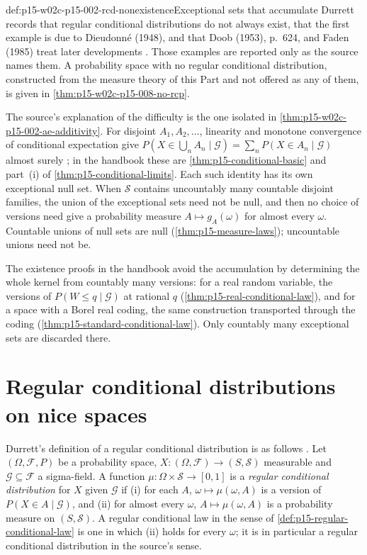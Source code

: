 \begin{hbwarning}{def:p15-w02c-p15-002-rcd-nonexistence}{Exceptional sets that accumulate}
Durrett records that regular conditional distributions do not always exist,
that the first example is due to Dieudonn\'e (1948), and that Doob (1953),
p.~624, and Faden (1985) treat later developments
\cite[p.~214]{DurrettPTEAuthor2019}. Those examples are reported only as
the source names them. A probability space with no regular conditional
distribution, constructed from the measure theory of this Part and not
offered as any of them, is given in \cref{thm:p15-w02c-p15-008-no-rcp}.

The source's explanation of the difficulty is the one isolated in
\cref{thm:p15-w02c-p15-002-ae-additivity}. For disjoint
\(A_1,A_2,\ldots\), linearity and monotone convergence of conditional
expectation give
\(P(X\in\bigcup_nA_n\mid\mathcal G)=\sum_nP(X\in A_n\mid\mathcal G)\)
almost surely \cite[p.~214]{DurrettPTEAuthor2019}; in the handbook these
are \cref{thm:p15-conditional-basic} and part~(i) of
\cref{thm:p15-conditional-limits}. Each such identity has its own
exceptional null set. When \(\mathcal S\) contains uncountably many
countable disjoint families, the union of the exceptional sets need not
be null, and then no choice of versions need give a probability measure
\(A\mapsto g_A(\omega)\) for almost every \(\omega\). Countable unions of
null sets are null (\cref{thm:p15-measure-laws}); uncountable unions need
not be.

The existence proofs in the handbook avoid the accumulation by
determining the whole kernel from countably many versions: for a real
random variable, the versions of \(P(W\leq q\mid\mathcal G)\) at rational
\(q\) (\cref{thm:p15-real-conditional-law}), and for a space with a Borel
real coding, the same construction transported through the coding
(\cref{thm:p15-standard-conditional-law}). Only countably many exceptional
sets are discarded there.
\end{hbwarning}

\section{Regular conditional distributions on nice spaces}
\label{sec:p15-w02c-p15-002-nice-rcd}

Durrett's definition of a regular conditional distribution is as follows
\cite[p.~214]{DurrettPTEAuthor2019}. Let \((\Omega,\mathcal F,P)\) be a
probability space, \(X:(\Omega,\mathcal F)\to(S,\mathcal S)\) measurable
and \(\mathcal G\subseteq\mathcal F\) a sigma-field. A function
\(\mu:\Omega\times\mathcal S\to[0,1]\) is a \emph{regular conditional
distribution} for \(X\) given \(\mathcal G\) if (i) for each \(A\),
\(\omega\mapsto\mu(\omega,A)\) is a version of \(P(X\in A\mid\mathcal G)\),
and (ii) for almost every \(\omega\), \(A\mapsto\mu(\omega,A)\) is a
probability measure on \((S,\mathcal S)\). A regular conditional law in
the sense of \cref{def:p15-regular-conditional-law} is one in which (ii)
holds for every \(\omega\); it is in particular a regular conditional
distribution in the source's sense.

